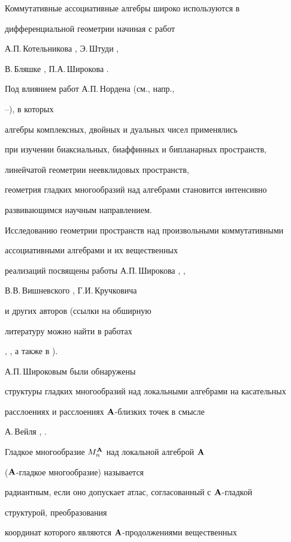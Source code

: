 Коммутативные ассоциативные алгебры широко используются в


дифференциальной геометрии начиная с работ


А.П.\,Котельникова \cite{Kot}, Э.\,Штуди \cite{Stud},


В.\,Бляшке \cite{Bla}, П.А.\,Широкова \cite{PShir}.


Под влиянием работ  А.П.\,Нордена (см., напр.,


\cite{Nord1}--\cite{Nord3}), в которых


алгебры комплексных, двойных и дуальных чисел применялись


при изучении биаксиальных, биаффинных и бипланарных пространств,


линейчатой геометрии неевклидовых пространств,


геометрия гладких многообразий над алгебрами становится интенсивно


развивающимся научным направлением.


Исследованию геометрии пространств над произвольными коммутативными


ассоциативными алгебрами и их вещественных


реализаций посвящены работы А.П.\,Широкова \cite{Shir}, \cite{Shir3},


В.В.\,Вишневского \cite{Vish}, Г.И.\,Кручковича \cite{Kruch}


и других авторов (ссылки на обширную


литературу можно найти в работах


\cite{Shir3}, \cite{Vish}, а также в \cite{V-Sh-Sh}).





А.П.\,Широковым \cite{Shir3} были обнаружены


структуры гладких многообразий над локальными алгебрами на касательных


расслоениях и расслоениях ${\bold A}$-близких точек в смысле


А.\,Вейля \cite{Weil}, \cite{KMS}.


Гладкое многообразие $M^{\bold A}_n$ над локальной алгеброй ${\bold A}$


(${\bold A}$-гладкое многообразие) называется


радиантным, если оно допускает атлас, согласованный с ${\bold A}$-гладкой


структурой, преобразования


координат которого являются ${\bold A}$-продолжениями вещественных


